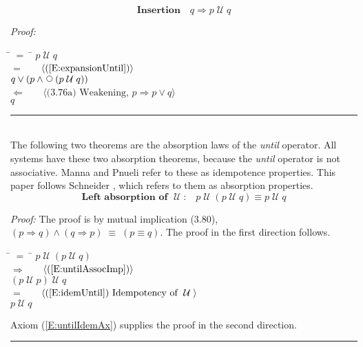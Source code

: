 \documentclass[fleqn, leqno]{article}
\newcommand{\lgap}{2pt}                             %
\newcommand{\mymathindent}{24pt}                    %
\newcommand{\equivs}{\ensuremath{\;\equiv\;}}       %
\newcommand{\impl}{\ensuremath{\Rightarrow}}        %
\newcommand{\foll}{\ensuremath{\Leftarrow}}         %
\newcommand{\Until}{\;\mathcal{U}\;}
\newcommand{\Next}{\;\,\text{\raisebox{3.5pt}{\circle{6}}}}
\newcommand{\myqed}{\hfill\rule[-.23ex]{1.2ex}{2.0ex}}
\newcommand{\Gll} {\langle}                         %
\newcommand{\Ggg} {\rangle}                         %
\newcommand{\Hint}[1]     {\ \ \ $\Gll              \mbox{#1} \Ggg$ }   %
\begin{document}

\begin{equation}\label{E:untilInsertion}
\textbf{Insertion}\quad q \impl p \Until q
\end{equation}

\emph{Proof:}
\begin{tabbing}
\hspace{\mymathindent} \= $= \;$ \= \kill
\> \> $p \Until q$\\[\lgap]
\> $=$ \> \Hint{(\ref{E:expansionUntil})} \\[\lgap]
\> \> $q \lor (p \land \Next(p \Until q))$\\[\lgap]
\> $\foll$ \> \Hint{(3.76a) Weakening, $p\impl p\lor q$} \\[\lgap]
\> \> $q$\\[\lgap]
\end{tabbing}
\myqed\\[\lgap]

The following two theorems are the absorption laws of the \textit{until} operator.
All systems have these two absorption theorems, because the \textit{until} operator is not associative.
Manna and Pnueli \cite{Manna} refer to these as idempotence properties.
This paper follows Schneider \cite{Schn}, which refers to them as absorption properties.
\begin{equation}\label{E:untilIdem}
\textbf{Left absorption of $\Until$:}\quad p \Until (p \Until q) \equiv p \Until q
\end{equation}

\emph{Proof:} The proof is by mutual implication (3.80), $(p\impl q) \land (q\impl p) \equivs (p\equiv q)$.
The proof in the first direction follows.
\begin{tabbing}
\hspace{\mymathindent} \= $= \;$ \= \kill
  \> \>   $p \Until (p \Until q)$\\[\lgap]
  \> $\impl$  \>  \Hint{(\ref{E:untilAssocImp})}\\[\lgap]
  \> \>   $(p \Until p) \Until q$\\[\lgap]
  \> $=$  \>  \Hint{(\ref{E:idemUntil}) Idempotency of $\Until$}\\[\lgap]
  \> \>   $p \Until q$
\end{tabbing}

Axiom (\ref{E:untilIdemAx}) supplies the proof in the second direction.
\myqed\\[\lgap]
\end{document}
